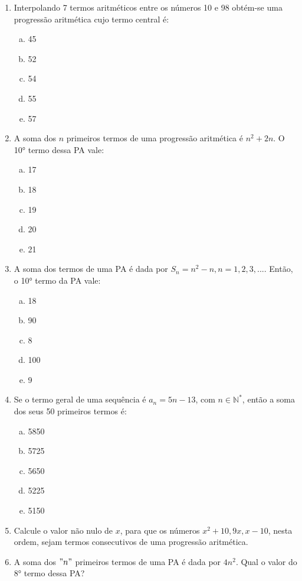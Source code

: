 \documentclass[a4paper,12pt, twocolumn]{article}
\begin{document}
\begin{enumerate}[1°)]
\begin{enumerate}[a)]
	\end{enumerate}
	\item Interpolando 7 termos aritméticos entre os números 10 e 98 obtém-se uma progressão aritmética cujo termo central é:
	\begin{enumerate}[a)]
		\item 45
		\item 52
		\item 54
		\item 55
		\item 57
	\end{enumerate}
	\item A soma dos $n$ primeiros termos de uma progressão aritmética é $n^2+2n$. O 10° termo dessa PA vale:
	\begin{enumerate}[a)]
		\item 17
		\item 18
		\item 19
		\item 20
		\item 21
	\end{enumerate}
	\item A soma dos termos de uma PA é dada por $S_n=n^2-n,n=1,2,3,...$. Então, o 10° termo da PA vale:
	\begin{enumerate}[a)]
		\item 18
		\item 90
		\item 8
		\item 100
		\item 9
	\end{enumerate}
	\item Se o termo geral de uma sequência é $a_n=5n-13$, com $n \in \mathbb{N}^{*}$, então a soma dos seus 50 primeiros termos é:
	\begin{enumerate}[a)]
		\item 5850
		\item 5725
		\item 5650
		\item 5225
		\item 5150
	\end{enumerate}
	\item Calcule o valor não nulo de $x$, para que os números $x^2 +10, 9x, x-10$, nesta ordem, sejam termos consecutivos de uma progressão aritmética.
	\item A soma dos $"n"$ primeiros termos de uma PA é dada por $4n^2$. Qual o valor do 8° termo dessa PA?
	
\end{enumerate}
\end{document}
